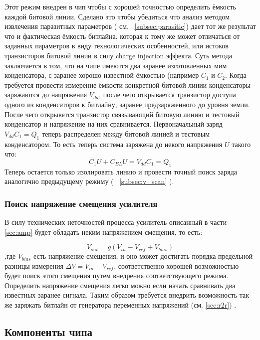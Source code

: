 \documentclass[a4paper,12pt]{article} %
\begin{document}
Этот режим внедрен в чип чтобы с хорошей точностью определить ёмкость каждой битовой линии. Сделано это чтобы убедиться что анализ методом извлечения паразитных параметров ( см. ~\ref{subsec:parasitic})  
дает тот же результат что и фактическая ёмкость битлайна, которая к тому же может отличаться от заданных параметров в виду технологических особенностей, или истоков транзисторов битовой линии в силу charge injection эффекта. Суть метода заключается в том, что на чипе имеются два заранее изготовленных мим конденсатора, с заранее хорошо известной ёмкостью (например $C_1 $ и $C_2 $. Когда требуется провести измерение ёмкости конкретной битовой линии конденсаторы заряжаются до напряжения $V_{dd}$, после чего открывается транзистор доступа одного из конденсаторов к битлайну, заранее предзаряженного до уровня земли. После чего открывется транзистор связывающий битовую линию и тестовый конденсатор и напряжение на них сравнивается. Первоначальный заряд  $ V_{dd}C_1 = Q_1 $ теперь распределен между битовой линией и тестовым конденсатором. То есть теперь система заряжена до некого напряжения $ U $ такого что: $$C_1 U + C_{BL} U = V_{dd}C_1 = Q_1  $$
Теперь остается только изолировать линию и провести точный поиск заряда аналогично предыдущему режиму ( ~\ref{subsec:v_scan} ).



\subsubsection{Поиск напряжение смещения усилителя }



В силу технических неточностей процесса усилитель описанный в части \ref{sec:amp} будет обладать неким напряжением смещения, то есть:

$$ V_{out} = g ( V_{in} - V_{ref} + V_{bias})  $$
,где $V_{bias}$ есть напряжение смещения, и оно может достигать порядка предельной разницы измерения $ \Delta V = V_{in} - V_{ref} $, соответственно хорошей возможностью будет поиск этого смещения путем внедрения соответствующего режима. Определить напряжение смещения легко можно если начать сравнивать два известных заранее сигнала. Таким образом требуется внедрить возможность так же заряжать битлайн от генератора переменных напряжений (см. \ref{sec:r2r}) . 






\subsection{Компоненты чипа}
\end{document}
